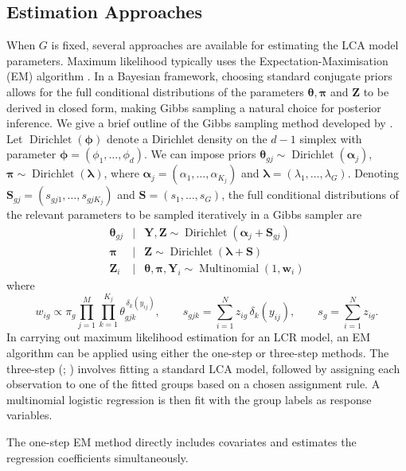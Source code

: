 \documentclass[11pt]{article}
\def\Mult{\operatorname{Multinomial}}
\def\Dir{\operatorname{Dirichlet}}
\def\boldw{\mathbf{w}}
\def\boldS{\mathbf{S}}
\def\boldY{\mathbf{Y}}
\def\boldZ{\mathbf{Z}}
\def\bsal{\boldsymbol{\alpha}}
\def\bslam{\boldsymbol{\lambda}}
\def\bsthet{\boldsymbol{\theta}}
\def\bsphi{\boldsymbol{\phi}}
\def\bspi{\boldsymbol{\pi}}
\theoremstyle{plain}
\theoremstyle{definition}
\begin{document}
\subsection{Estimation Approaches}\label{subsec:lca_gibbs}
When $G$ is fixed, several approaches are available for estimating the LCA model parameters. Maximum likelihood typically uses the Expectation-Maximisation (EM) algorithm \citep{dempster_maximum_1977}. In a Bayesian framework, choosing standard conjugate priors allows for the full conditional distributions of the parameters $\bsthet, \bspi$ and $\boldZ$ to be derived in closed form, making Gibbs sampling \citep{gelfand_sampling-based_1990} a natural choice for posterior inference. We give a brief outline of the Gibbs sampling method developed by \citet{garrett_latent_2000}. Let $\Dir(\bsphi)$ denote a Dirichlet density on the $d-1$ simplex with parameter $\bsphi = (\phi_1,\dots,\phi_d)$. We can impose priors $\bsthet_{gj} \sim \Dir(\bsal_j)$, $\bspi \sim \Dir(\bslam)$, where $\bsal_j = (\alpha_1, \dots, \alpha_{K_j})$ and $\bslam = (\lambda_1,\dots,\lambda_G)$. Denoting $\boldS_{gj} = (s_{gj1}, \ldots, s_{gjK_j})$ and $\boldS = (s_1, \ldots, s_G)$, the full conditional distributions of the relevant parameters to be sampled iteratively in a Gibbs sampler are
\begin{eqnarray*}
\bsthet_{gj} &\mid& \boldY, \boldZ \sim \Dir(\bsal_j + \boldS_{gj})\\
\bspi &\mid & \boldZ \sim \Dir(\bslam + \boldS)\\
\boldZ_i &\mid& \bsthet, \bspi, \boldY_i \sim \Mult(1,\boldw_i)
\end{eqnarray*}
where 
\begin{equation}\label{LCA_sampling_quantities}
w_{ig} \propto \pi_g \prod_{j=1}^M \prod_{k=1}^{K_j} \theta_{gjk}^{\,\delta_k(y_{ij})},\qquad s_{gjk} = \sum_{i=1}^N z_{ig}\,\delta_k(y_{ij}), \qquad s_g = \sum_{i=1}^N z_{ig}. %
\end{equation}
In carrying out maximum likelihood estimation for an LCR model, an EM algorithm can be applied using either the one-step or three-step methods. The three-step (\citet{vermunt_latent_2010}; \citet{bolck_estimating_2004}) involves fitting a standard LCA model, followed by assigning each observation to one of the fitted groups based on a chosen assignment rule. A multinomial logistic regression is then fit with the group labels as response variables. 

The one-step EM method \citep{bandeen-roche_latent_1997} directly includes  covariates and estimates the regression coefficients simultaneously.  
\end{document}
